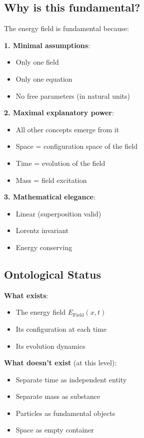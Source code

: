 	\subsection{Why is this fundamental?}
	
	\begin{philosophical}
		The energy field is fundamental because:
		
		\textbf{1. Minimal assumptions}:
		\begin{itemize}
			\item Only one field
			\item Only one equation
			\item No free parameters (in natural units)
		\end{itemize}
		
		\textbf{2. Maximal explanatory power}:
		\begin{itemize}
			\item All other concepts emerge from it
			\item Space = configuration space of the field
			\item Time = evolution of the field
			\item Mass = field excitation
		\end{itemize}
		
		\textbf{3. Mathematical elegance}:
		\begin{itemize}
			\item Linear (superposition valid)
			\item Lorentz invariant
			\item Energy conserving
		\end{itemize}
	\end{philosophical}
	
	\subsection{Ontological Status}
	
	\textbf{What exists}:
	\begin{itemize}
		\item The energy field $E_{\text{Field}}(x,t)$
		\item Its configuration at each time
		\item Its evolution dynamics
	\end{itemize}
	
	\textbf{What doesn't exist} (at this level):
	\begin{itemize}
		\item Separate time as independent entity
		\item Separate mass as substance
		\item Particles as fundamental objects
		\item Space as empty container
	\end{itemize}
	
